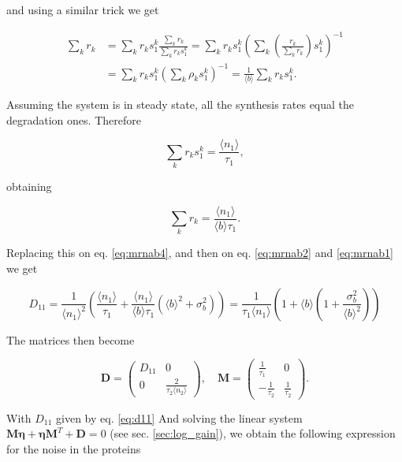 and using a similar trick we get

\begin{equation*}
  \begin{split}
    \sum_kr_k&=\sum_kr_ks_1^k\frac{\sum_kr_k}{\sum_kr_ks_1^k}=\sum_kr_ks_1^k\left(\sum_k\left(\frac{r_k}{\sum_kr_k}\right)s_1^k\right)^{-1}\\
    &=\sum_kr_ks_1^k\left(\sum_k\rho_ks_1^k\right)^{-1}=\frac{1}{\langle b\rangle}\sum_kr_ks_1^k.
  \end{split}
\end{equation*}

Assuming the system is in steady state, all the synthesis rates equal the degradation ones. Therefore

\begin{equation*}
  \sum_kr_ks_1^k = \frac{\langle n_1\rangle}{\tau_1},
\end{equation*}

obtaining

\begin{equation*}
   \sum_kr_k = \frac{\langle n_1\rangle}{\langle b\rangle\tau_1}.
\end{equation*}

Replacing this on eq. \eqref{eq:mrnab4}, and then on eq. \eqref{eq:mrnab2} and \eqref{eq:mrnab1} we get

\begin{equation}
  \label{eq:d11}
  D_{11}=\frac{1}{\langle n_1\rangle^2}\left(\frac{\langle n_1\rangle}{\tau_1}+\frac{\langle n_1\rangle}{\langle b\rangle\tau_1}\left(\langle b\rangle^2+\sigma_b^2\right)\right) = \frac{1}{\tau_1\langle n_1\rangle}\left( 1+ \langle b\rangle\left(1+\frac{\sigma_b^2}{\langle b\rangle^2}\right)\right)
\end{equation}

The matrices then become

\begin{equation*}
  \mathbf{D} = 
  \begin{pmatrix}
    D_{11} & 0 \\
    0 & \frac{2}{\tau_2\langle n_2\rangle}
  \end{pmatrix}, \quad
  \mathbf{M} =
  \begin{pmatrix}
    \frac{1}{\tau_1} & 0 \\
    -\frac{1}{\tau_2} & \frac{1}{\tau_2}
  \end{pmatrix}.
\end{equation*}

With $D_{11}$ given by eq. \eqref{eq:d11} And solving the linear system $\mathbf{M}\mathbf{\eta} + \mathbf{\eta M}^T+\mathbf{D}=0$ (see sec. \ref{sec:log_gain}), we obtain the following expression for the noise in the proteins

